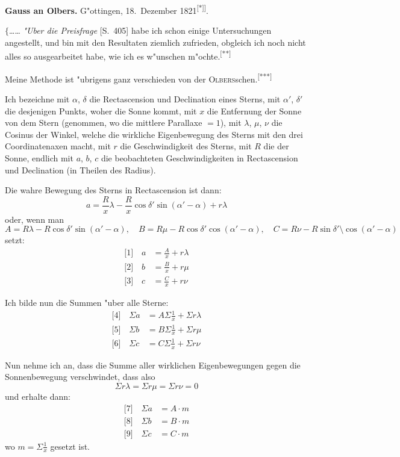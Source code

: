 \documentclass[12pt,a4paper]{article}
\theoremstyle{plain}
\theoremstyle{definition}
\theoremstyle{remark}
\newcommand{\besc}[1]{\textsc{#1}}
\begin{document}
\vspace{1em}
\begin{center}
\textbf{Gauss an Olbers.} \quad G"ottingen, 18.\ Dezember 1821\textsuperscript{[*]]}.
\end{center}

\noindent
$\{$\ldots{}\ldots{} {\itshape "Uber die Preisfrage} \besc{[S.\ 405]} habe ich schon einige Untersuchungen angestellt, und bin mit den Resultaten ziemlich zufrieden, obgleich ich noch nicht alles so ausgearbeitet habe, wie ich es w"unschen m"ochte.\textsuperscript{[**]}

Meine Methode ist "ubrigens ganz verschieden von der \besc{Olbers}schen.\textsuperscript{[***]}

Ich bezeichne mit $\alpha$, $\delta$ die Rectascension und Declination eines Sterns, mit $\alpha'$, $\delta'$ die desjenigen Punkts, woher die Sonne kommt, mit $x$ die Entfernung der Sonne von dem Stern (genommen, wo die mittlere Parallaxe $= 1$), mit $\lambda$, $\mu$, $\nu$ die Cosinus der Winkel, welche die wirkliche Eigenbewegung des Sterns mit den drei Coordinatenaxen macht, mit $r$ die Geschwindigkeit des Sterns, mit $R$ die der Sonne, endlich mit $a$, $b$, $c$ die beobachteten Geschwindigkeiten in Rectascension und Declination (in Theilen des Radius).

Die wahre Bewegung des Sterns in Rectascension ist dann:
\[
a = \frac{R}{x}\lambda - \frac{R}{x}\cos\delta' \sin(\alpha' - \alpha) + r\lambda
\]
oder, wenn man
\[
A = R\lambda - R\cos\delta' \sin(\alpha' - \alpha),\quad B = R\mu - R\cos\delta' \cos(\alpha' - \alpha),\quad C = R\nu - R\sin\delta'
\setminus\cos(\alpha' - \alpha)
\]
setzt:
\begin{align*}
\text{[1]}\quad a &= \frac{A}{x} + r\lambda\\
\text{[2]}\quad b &= \frac{B}{x} + r\mu\\
\text{[3]}\quad c &= \frac{C}{x} + r\nu
\end{align*}

Ich bilde nun die Summen "uber alle Sterne:
\begin{align*}
\text{[4]}\quad \Sigma a &= A\Sigma\frac{1}{x} + \Sigma r\lambda\\
\text{[5]}\quad \Sigma b &= B\Sigma\frac{1}{x} + \Sigma r\mu\\
\text{[6]}\quad \Sigma c &= C\Sigma\frac{1}{x} + \Sigma r\nu
\end{align*}

Nun nehme ich an, dass die Summe aller wirklichen Eigenbewegungen gegen die Sonnenbewegung verschwindet, dass also
\[
\Sigma r\lambda = \Sigma r\mu = \Sigma r\nu = 0
\]
und erhalte dann:
\begin{align*}
\text{[7]}\quad \Sigma a &= A \cdot m\\
\text{[8]}\quad \Sigma b &= B \cdot m\\
\text{[9]}\quad \Sigma c &= C \cdot m
\end{align*}
wo $m = \Sigma\frac{1}{x}$ gesetzt ist.
\end{document}
